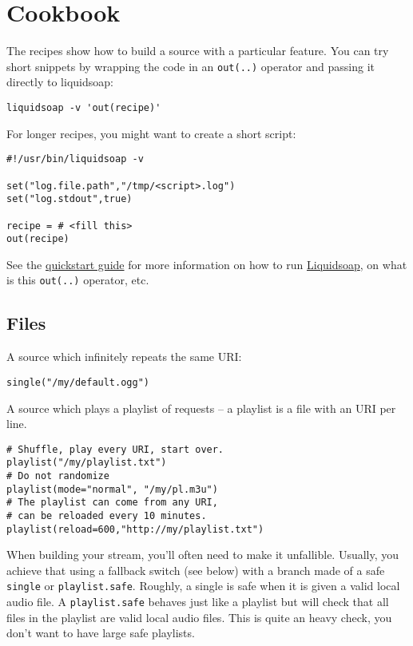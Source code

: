 \section{Cookbook}
The recipes show how to build a source with a particular feature. You can try short snippets by wrapping the code in an \verb+out(..)+ operator and passing it directly to liquidsoap:

\begin{verbatim}
liquidsoap -v 'out(recipe)'
\end{verbatim}
For longer recipes, you might want to create a short script:

\begin{verbatim}
#!/usr/bin/liquidsoap -v

set("log.file.path","/tmp/<script>.log")
set("log.stdout",true)

recipe = # <fill this>
out(recipe)
\end{verbatim}
See the \href{quick_start.html}{quickstart guide} for more information on how to run \href{index.html}{Liquidsoap}, on what is this \verb+out(..)+ operator, etc.

\subsection{Files}
A source which infinitely repeats the same URI:

\begin{verbatim}
single("/my/default.ogg")
\end{verbatim}
A source which plays a playlist of requests -- a playlist is a file with an URI per line.

\begin{verbatim}
# Shuffle, play every URI, start over.
playlist("/my/playlist.txt")
# Do not randomize
playlist(mode="normal", "/my/pl.m3u")
# The playlist can come from any URI,
# can be reloaded every 10 minutes.
playlist(reload=600,"http://my/playlist.txt")
\end{verbatim}
When building your stream, you'll often need to make it unfallible. Usually, you achieve that using a fallback switch (see below) with a branch made of a safe \verb+single+ or \verb+playlist.safe+. Roughly, a single is safe when it is given a valid local audio file. A \verb+playlist.safe+ behaves just like a playlist but will check that all files in the playlist are valid local audio files. This is quite an heavy check, you don't want to have large safe playlists.

